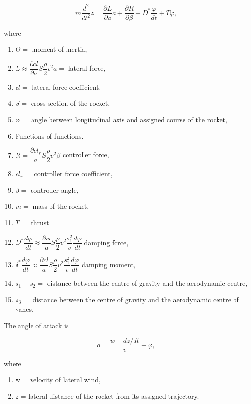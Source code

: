 \documentclass[12pt, a4paper]{article}
\begin{document}
\begin{equation}
  m\frac{d^{2}}{dt^{2}}z=\frac{\partial L}{\partial a}a+\frac{\partial R}{\partial\beta}+D^{*}\frac{\varphi}{dt}+T\varphi,
\end{equation}

where

\begin{enumerate}[label={}]
  \item $\Theta=$ moment of inertia,
  \item $L\approx\dfrac{\partial cl}{\partial a}S\dfrac{\rho}{2}v^{2}a=$ lateral force,
  \item $cl=$ lateral force coefficient,
  \item $S=$ cross-section of the rocket,
  \item $\varphi=$ angle between longitudinal axis and assigned course of the rocket,
  \item Functions of functions.

  \item $R=\dfrac{\partial cl_{r}}{a}S\dfrac{\rho}{2}v^{2}\beta$ controller force,
  \item $cl_{r}=$ controller force coefficient,
  \item $\beta=$ controller angle,
  \item $m=$ mass of the rocket,
  \item $T=$ thrust,
  \item $D^{*}\dfrac{d\varphi}{dt}\approx\dfrac{\partial cl}{a}S\dfrac{\rho}{2}v^{2}\dfrac{s^{2}_{1}}{v}\dfrac{d\varphi}{dt}$ damping force,
  \item $\delta^{*}\dfrac{d\varphi}{dt}\approx\dfrac{\partial cl}{a}S\dfrac{\rho}{2}v^{2}\dfrac{s^{2}_{1}}{v}\dfrac{d\varphi}{dt}$ damping moment,
  \item $s_{1}-s_{2}=$ distance between the centre of gravity and the aerodynamic centre,
  \item $s_{3}=$ distance between the centre of gravity and the aerodynamic centre of vanes.
\end{enumerate}

The angle of attack is

\begin{equation}
  a=\dfrac{w-dz/ dt}{v}+\varphi,
\end{equation}

where

\begin{enumerate}[label={}]
  \item w = velocity of lateral wind,
  \item z = lateral distance of the rocket from its assigned trajectory.
\end{enumerate}
\end{document}
